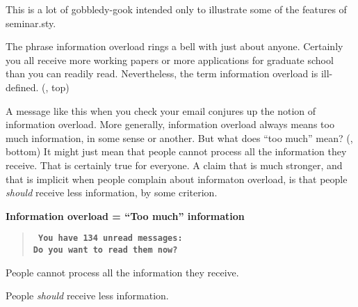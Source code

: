 \maketitle          %

\begin{slide}
  \ifslidesonly              %
    \maketitle
    \addtocounter{slide}{-1}
  \fi
\end{slide}

This is a lot of gobbledy-gook intended only to illustrate some of the
features of seminar.sty.

 The phrase information overload rings a bell with just about anyone.
Certainly you all receive more working papers or more applications for
graduate school than you can readily read. Nevertheless, the term information
overload is ill-defined. (, top)

 A message like this when you check your email conjures up the notion of
information overload. More generally, information overload always means too
much information, in some sense or another. But what does ``too much'' mean?
(, bottom) It might just mean that people cannot process all
the information they receive. That is certainly true for everyone. A claim
that is much stronger, and that is implicit when people complain about
informaton overload, is that people {\em should} receive less information, by
some criterion.

\begin{slide}\label{too_much}%
\begin{center}
  \large\bf
 Information overload = ``Too much'' information
\end{center}
\smallskip

\begin{verse} \bf\tt
  You have 134 unread messages:\\
  Do you want to read them now?
\end{verse}

\begin{enumerate}
  {
  \item People { cannot process all} the information they receive.}
  \item People {\em should} receive less information.
 \end{enumerate}
\end{slide}

